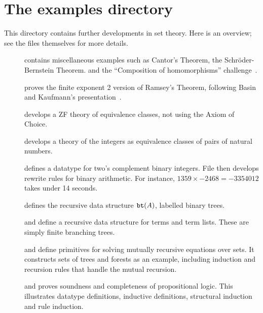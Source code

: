 \section{The examples directory}
This directory contains further developments in {\ZF} set theory.  Here is
an overview; see the files themselves for more details.
\begin{description}
\item[] contains miscellaneous examples such as
  Cantor's Theorem, the Schr\"oder-Bernstein Theorem.  and the
  ``Composition of homomorphisms'' challenge~\cite{boyer86}.

\item[]
proves the finite exponent 2 version of Ramsey's Theorem, following Basin
and Kaufmann's presentation~\cite{basin91}.

\item[]
develops a ZF theory of equivalence classes, not using the Axiom of Choice.

\item[]
develops a theory of the integers as equivalence classes of pairs of
natural numbers.

\item[]
defines a datatype for two's complement binary integers.  File
 then develops rewrite rules for binary
arithmetic.  For instance, $1359\times {-}2468 = {-}3354012$ takes under
14 seconds.

\item[]
defines the recursive data structure ${\tt bt}(A)$, labelled binary trees.

\item[] 
  and  define a recursive data structure for
  terms and term lists.  These are simply finite branching trees.

\item[]
  and  define primitives for solving mutually
  recursive equations over sets.  It constructs sets of trees and forests
  as an example, including induction and recursion rules that handle the
  mutual recursion.

\item[]
  and  proves soundness and completeness of
  propositional logic.  This illustrates datatype definitions, inductive
  definitions, structural induction and rule induction.


\end{description}
